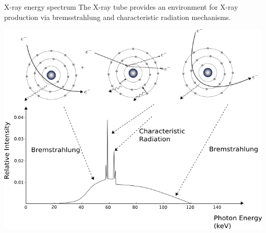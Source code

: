 \begin{frame}{X-ray energy spectrum}
    The X-ray tube provides an environment for X-ray production via bremsstrahlung and characteristic radiation mechanisms.
    \vspace{-0.4cm}
    \begin{center}%
    \includegraphics[height=0.8\textheight, trim={0  0.0cm 0 0.5cm},clip]{images/spectrum_2types}
\end{center}
\end{frame}




